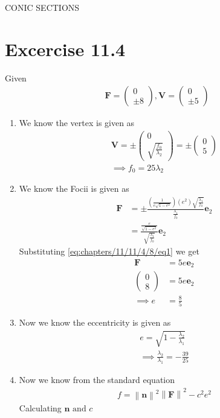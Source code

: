 \documentclass[12pt]{article}
\providecommand{\brak}[1]{\ensuremath{\left(#1\right)}}
\providecommand{\norm}[1]{\left\lVert#1\right\rVert}
\newcommand{\myvec}[1]{\ensuremath{\begin{pmatrix}#1\end{pmatrix}}}
\let\vec\mathbf
\begin{document}
\begin{center}
\textbf\large{CONIC SECTIONS}

\end{center}
\section*{Excercise 11.4}
\fi
Given
\begin{align}
	\vec{F} = \myvec{0\\\pm 8}, \vec{V} = \myvec{0\\\pm 5} 
\end{align}
\begin{enumerate}
\item We know the vertex is given as
\begin{align}
	\vec{V} = \pm\myvec{0\\\sqrt{\frac{f_0}{\lambda_2}}} = \pm\myvec{0\\5}\\
	\label{eq:chapters/11/11/4/8/eq1}
	\implies f_0 = 25\lambda_2
\end{align}
\item We know the Focii is given as
\begin{align}
	\vec{F} &= \pm \frac{\brak{\frac{1}{e\sqrt{1-e^2}}}\brak{e^2}\sqrt{\frac{\lambda_1}{f_0}}}{\frac{\lambda_1}{f_0}}\vec{e}_2\\
	        &= \frac{\frac{e}{\sqrt{1-e^2}}}{\sqrt{\frac{\lambda_1}{f_0}}}\vec{e}_2
\end{align}
Substituting \eqref{eq:chapters/11/11/4/8/eq1} we get
\begin{align}
	\vec{F} &= 5e\vec{e}_2\\
	\myvec{0\\8} &= 5e\vec{e}_2\\
	\implies e &= \frac{8}{5}
\end{align}
\item Now we know the eccentricity is given as
\begin{align}
	e = \sqrt{1-\frac{\lambda_2}{\lambda_1}}\\
	\label{eq:chapters/11/11/4/8/eq2}
	\implies \frac{\lambda_2}{\lambda_1} = -\frac{39}{25}
\end{align}
\item Now we know from the standard equation
\begin{align}
	\label{eq:chapters/11/11/4/8/eq3}
	f = \norm{\vec{n}}^2 \norm{\vec{F}}^2 - c^2 e^2
\end{align}
Calculating $\vec{n} \text{ and } c$
\begin{align}

\end{align}
\end{enumerate}
\end{document}
